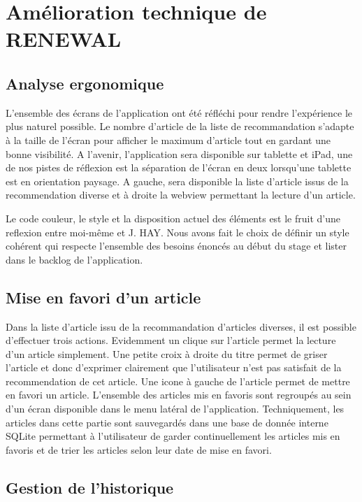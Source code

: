 \chapter{Amélioration technique de RENEWAL}
\label{sec:Amélioration technique de RENEWAL}

\section{Analyse ergonomique}

L'ensemble des écrans de l'application ont été réfléchi pour rendre l'expérience le plus naturel possible. Le nombre d'article de la liste de recommandation s'adapte à la taille de l'écran pour afficher le maximum d'article tout en gardant une bonne visibilité. A l'avenir, l'application sera disponible sur tablette et iPad, une de nos pistes de réflexion est la séparation de l'écran en deux lorsqu'une tablette est en orientation paysage. A gauche, sera disponible la liste d'article issus de la recommendation diverse et à droite la webview permettant la lecture d'un article.

Le code couleur, le style et la disposition actuel des éléments est le fruit d'une reflexion entre moi-même et J. HAY. Nous avons fait le choix de définir un style cohérent qui respecte l'ensemble des besoins énoncés au début du stage et lister dans le backlog de l'application. 

\section{Mise en favori d'un article}

Dans la liste d'article issu de la recommandation d'articles diverses, il est possible d'effectuer trois actions. Evidemment un clique sur l'article permet la lecture d'un article simplement. Une petite croix à droite du titre permet de griser l'article et donc d'exprimer clairement que l'utilisateur n'est pas satisfait de la recommendation de cet article. Une icone à gauche de l'article permet de mettre en favori un article. L'ensemble des articles mis en favoris sont regroupés au sein d'un écran disponible dans le menu latéral de l'application. Techniquement, les articles dans cette partie sont sauvegardés dans une base de donnée interne SQLite permettant à l'utilisateur de garder continuellement les articles mis en favoris et de trier les articles selon leur date de mise en favori. 

\section{Gestion de l'historique}

